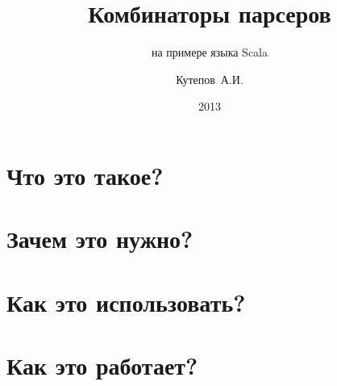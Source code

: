 \documentclass{beamer}
\title{Комбинаторы парсеров}
\subtitle{на примере языка Scala}
\author{Кутепов~А.И.}
\date{2013}
\begin{document}
\begin{frame}
  \titlepage
\end{frame}

\begin{frame}
  \tableofcontents
\end{frame}

\section{Что это такое?}

\section{Зачем это нужно?}

\section{Как это использовать?}

\section{Как это работает?}
\end{document}
